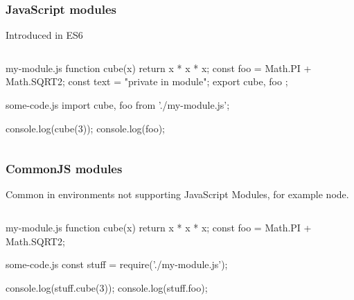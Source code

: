 \begin{frame}[fragile] \frametitle{JavaScript modules}
  Introduced in ES6
\begin{columns}[onlytextwidth]
  \begin{column}{1\textwidth}
\begin{CodeBox}{my-module.js}
function cube(x) {
  return x * x * x;
}
const foo = Math.PI + Math.SQRT2;
const text = "private in module";
export { cube, foo };
\end{CodeBox}
\begin{CodeBox}{some-code.js}
import { cube, foo } from './my-module.js';

console.log(cube(3));
console.log(foo);
\end{CodeBox}
  \end{column}
\end{columns}%
\end{frame}

\begin{frame}[fragile] \frametitle{CommonJS modules}
  Common in environments not supporting JavaScript Modules, for example node.
\begin{columns}[onlytextwidth]
  \begin{column}{1\textwidth}
\begin{CodeBox}{my-module.js}
function cube(x) {
  return x * x * x;
}
const foo = Math.PI + Math.SQRT2;
\end{CodeBox}
\begin{CodeBox}{some-code.js}
const stuff = require('./my-module.js');

console.log(stuff.cube(3));
console.log(stuff.foo);
\end{CodeBox}
  \end{column}
\end{columns}%
\end{frame}
